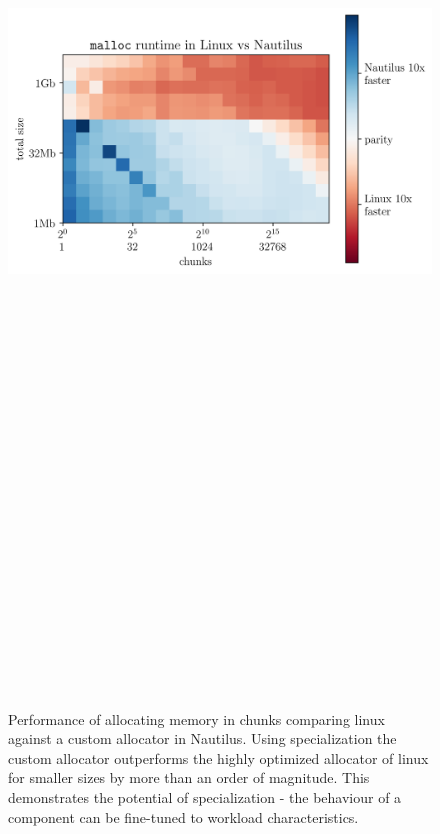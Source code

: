 \documentclass[final]{beamer}
\newlength{\onecolwid}
\begin{document}
\begin{frame}[t]
\begin{columns}[t]
\begin{column}{\onecolwid}
\begin{figure}
        \includegraphics[height=30cm]{plots/malloc.png}
        \label{fig:1}
        \caption{Performance of allocating memory in chunks comparing linux against a custom  allocator in Nautilus. Using specialization the custom allocator outperforms the highly optimized allocator of linux for smaller sizes by more than an order of magnitude. This demonstrates the potential of specialization - the behaviour of a component can be fine-tuned to workload characteristics.}
      \end{figure}
      
      
      
    \end{column}


\end{columns}
\end{frame}
\end{document}
